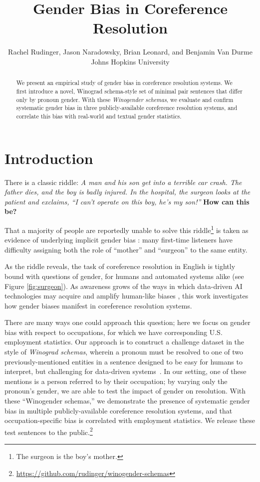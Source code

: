 \documentclass[11pt,a4paper]{article}
\title{Gender Bias in Coreference Resolution}
\author{Rachel Rudinger,\hspace{.3em} Jason Naradowsky,\hspace{.3em} Brian Leonard,\hspace{.3em} and Benjamin Van Durme \\
  Johns Hopkins University\\}
\date{}
\begin{document}
\maketitle
\begin{abstract}
We present an empirical study of gender bias in coreference resolution systems. We first introduce a novel, Winograd schema-style set of minimal pair sentences that differ only by pronoun gender.
With these \textit{Winogender schemas}, we evaluate and confirm systematic gender bias in three publicly-available coreference resolution systems, and correlate this bias with real-world and textual gender statistics.
\end{abstract}


\section{Introduction}
\label{sec:intro}

There is a classic riddle: \textit{A man and his son get into a terrible car crash. The father dies, and the boy is badly injured. In the hospital, the surgeon looks at the patient and exclaims, ``I can't operate on this boy, he's my son!''} \textbf{How can this be?}

That a majority of people are reportedly unable to solve this riddle\footnote{The surgeon is the boy's mother.} is taken as evidence of underlying implicit gender bias \cite{wapman}:  many first-time listeners have difficulty assigning both the role of ``mother'' and ``surgeon'' to the same entity.

As the riddle reveals, the task of coreference resolution in English is tightly bound with questions of gender, for humans and automated systems alike (see Figure \ref{fig:surgeon}).
As awareness grows of the ways in which data-driven AI technologies may acquire and amplify human-like biases \cite{Caliskan183,barocas2016big,hovy-spruit:2016:P16-2}, this work investigates how gender biases manifest in coreference resolution systems.


There are many ways one could approach this question; here we focus on gender bias with respect to occupations, for which we have corresponding U.S. employment statistics.
Our approach is to construct a challenge dataset in the style of \emph{Winograd schemas}, wherein a pronoun must be resolved to one of two previously-mentioned entities in a sentence designed to be easy for humans to interpret, but challenging for data-driven systems~\cite{Levesque2011TheWS}. In our setting, one of these mentions is a person referred to by their occupation; by varying only the pronoun's gender, we are able to test the impact of gender on resolution. With these ``Winogender schemas,'' we demonstrate the presence of systematic gender bias in multiple publicly-available coreference resolution systems, and that occupation-specific bias is correlated with employment statistics. We release these test sentences to the public.\footnote{\url{https://github.com/rudinger/winogender-schemas}}
\end{document}
